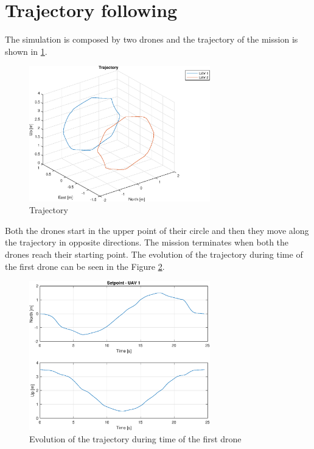 \section{Trajectory following}

The simulation is composed by two drones and the trajectory of the mission is shown
in \ref{fig:trajectory}.

\begin{figure}
\centering
\includegraphics[width=0.7\textwidth]{chapters/chapter-04/figures/trajectory.eps}
\caption{Trajectory}
\label{fig:trajectory}
\end{figure}

Both the drones start in the upper point of their circle and then they move along the
trajectory in opposite directions. The mission terminates when both the drones reach
their starting point.
The evolution of the trajectory during time of the first drone can be seen in the Figure
\ref{fig:trajectory_during_time}.

\begin{figure}
\centering
\includegraphics[width=0.7\textwidth]{chapters/chapter-04/figures/pos.eps}
\caption{Evolution of the trajectory during time of the first drone}
\label{fig:trajectory_during_time}
\end{figure}

